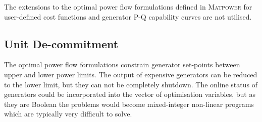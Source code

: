 The extensions to the optimal power flow formulations defined in
\textsc{Matpower} for user-defined cost functions and generator P-Q capability
curves are not utilised.

%

\subsection{Unit De-commitment}
\label{sec:decommit}
The optimal power flow formulations constrain generator set-points between
upper and lower power limits.  The output of expensive generators can be
reduced to the lower limit, but they can not be completely shutdown.  The
online status of generators could be incorporated into the vector of
optimisation variables, but as they are Boolean the problems would become
mixed-integer non-linear programs which are typically very difficult to
solve.

